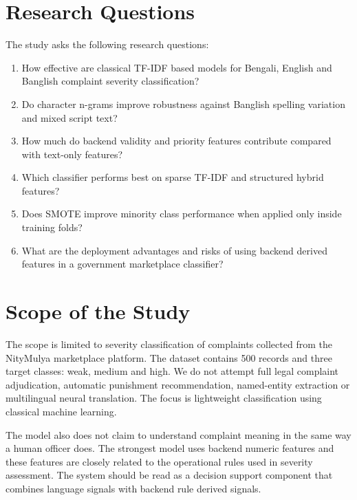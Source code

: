 \documentclass[12pt,a4paper,openany]{book}
\begin{document}
\section{Research Questions}
The study asks the following research questions:
\begin{enumerate}
  \item How effective are classical TF-IDF based models for Bengali, English and Banglish complaint severity classification?
  \item Do character n-grams improve robustness against Banglish spelling variation and mixed script text?
  \item How much do backend validity and priority features contribute compared with text-only features?
  \item Which classifier performs best on sparse TF-IDF and structured hybrid features?
  \item Does SMOTE improve minority class performance when applied only inside training folds?
  \item What are the deployment advantages and risks of using backend derived features in a government marketplace classifier?
\end{enumerate}

\section{Scope of the Study}
The scope is limited to severity classification of complaints collected from the NityMulya marketplace platform. The dataset contains 500 records and three target classes: weak, medium and high. We do not attempt full legal complaint adjudication, automatic punishment recommendation, named-entity extraction or multilingual neural translation. The focus is lightweight classification using classical machine learning.

The model also does not claim to understand complaint meaning in the same way a human officer does. The strongest model uses backend numeric features and these features are closely related to the operational rules used in severity assessment. The system should be read as a decision support component that combines language signals with backend rule derived signals.
\end{document}
